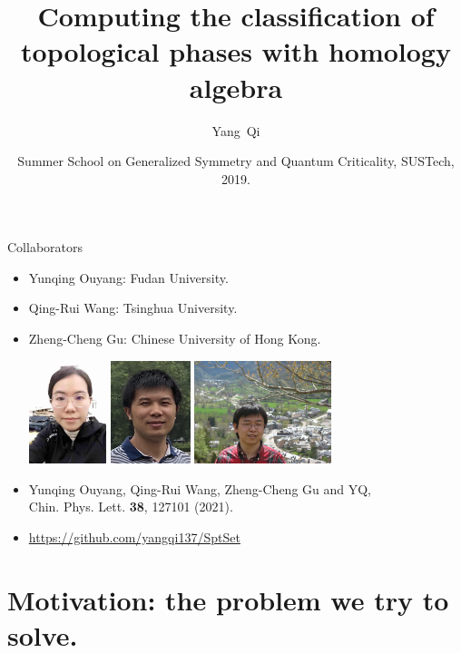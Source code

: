 \documentclass[xcolor=table, aspectratio=169]{beamer}
\title[Computing fSPT with homology algebra] %
{Computing the classification of topological phases with homology algebra}
\author[Y Qi] %
{Yang~Qi}
\institute[Fudan] %
{Department of Physics, Fudan University}
\date{Summer School on Generalized Symmetry and Quantum Criticality, SUSTech, 2019.}
\begin{document}
\begin{frame}
  \titlepage
\end{frame}

\begin{frame}{Collaborators}
\begin{itemize}
\item Yunqing Ouyang: Fudan University.
\item Qing-Rui Wang: Tsinghua University.
\item Zheng-Cheng Gu: Chinese University of Hong Kong.
\begin{center}
	\includegraphics[height=3cm]{../people/yunqing}
	\includegraphics[height=3cm]{../people/qingrui}
	\includegraphics[height=3cm]{../people/zhengcheng}
\end{center}
\item Yunqing Ouyang, Qing-Rui Wang, Zheng-Cheng Gu and YQ,\\
Chin. Phys. Lett. \textbf{38}, 127101 (2021).
\item \url{https://github.com/yangqi137/SptSet}
\end{itemize}
\end{frame}

\section{Motivation: the problem we try to solve.}
\end{document}

